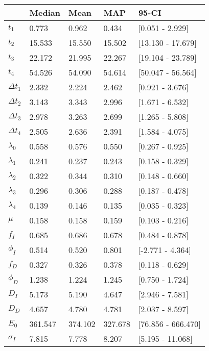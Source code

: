 \begin{tabular}{lllll}
\toprule
{} &   Median &     Mean &      MAP &               95-CI \\
\midrule
$t_1$        &    0.773 &    0.962 &    0.434 &     [0.051 - 2.929] \\
$t_2$        &   15.533 &   15.550 &   15.502 &   [13.130 - 17.679] \\
$t_3$        &   22.172 &   21.995 &   22.267 &   [19.104 - 23.789] \\
$t_4$        &   54.526 &   54.090 &   54.614 &   [50.047 - 56.564] \\
$\Delta t_1$ &    2.332 &    2.224 &    2.462 &     [0.921 - 3.676] \\
$\Delta t_2$ &    3.143 &    3.343 &    2.996 &     [1.671 - 6.532] \\
$\Delta t_3$ &    2.978 &    3.263 &    2.699 &     [1.265 - 5.808] \\
$\Delta t_4$ &    2.505 &    2.636 &    2.391 &     [1.584 - 4.075] \\
$\lambda_0$  &    0.558 &    0.576 &    0.550 &     [0.267 - 0.925] \\
$\lambda_1$  &    0.241 &    0.237 &    0.243 &     [0.158 - 0.329] \\
$\lambda_2$  &    0.322 &    0.344 &    0.310 &     [0.148 - 0.660] \\
$\lambda_3$  &    0.296 &    0.306 &    0.288 &     [0.187 - 0.478] \\
$\lambda_4$  &    0.139 &    0.146 &    0.135 &     [0.035 - 0.323] \\
$\mu$        &    0.158 &    0.158 &    0.159 &     [0.103 - 0.216] \\
$f_I$        &    0.685 &    0.686 &    0.678 &     [0.484 - 0.878] \\
$\phi_I$     &    0.514 &    0.520 &    0.801 &    [-2.771 - 4.364] \\
$f_D$        &    0.327 &    0.326 &    0.378 &     [0.118 - 0.629] \\
$\phi_D$     &    1.238 &    1.224 &    1.245 &     [0.750 - 1.724] \\
$D_I$        &    5.173 &    5.190 &    4.647 &     [2.946 - 7.581] \\
$D_D$        &    4.657 &    4.780 &    4.781 &     [2.037 - 8.597] \\
$E_0$        &  361.547 &  374.102 &  327.678 &  [76.856 - 666.470] \\
$\sigma_I$   &    7.815 &    7.778 &    8.207 &    [5.195 - 11.068] \\

\end{tabular}
